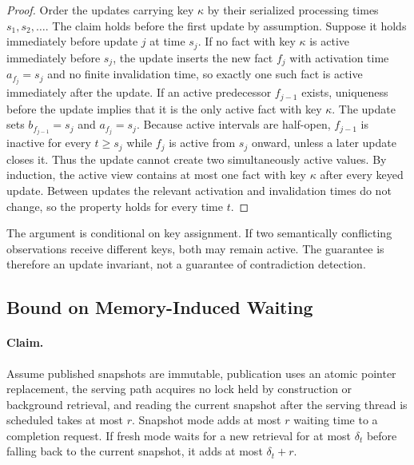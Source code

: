 \documentclass[letterpaper]{article} %
\begin{document}
\begin{proof}
Order the updates carrying key $\kappa$ by their serialized processing times $s_1,s_2,\ldots$. The claim holds before the first update by assumption. Suppose it holds immediately before update $j$ at time $s_j$. If no fact with key $\kappa$ is active immediately before $s_j$, the update inserts the new fact $f_j$ with activation time $a_{f_j}=s_j$ and no finite invalidation time, so exactly one such fact is active immediately after the update. If an active predecessor $f_{j-1}$ exists, uniqueness before the update implies that it is the only active fact with key $\kappa$. The update sets $b_{f_{j-1}}=s_j$ and $a_{f_j}=s_j$. Because active intervals are half-open, $f_{j-1}$ is inactive for every $t\ge s_j$ while $f_j$ is active from $s_j$ onward, unless a later update closes it. Thus the update cannot create two simultaneously active values. By induction, the active view contains at most one fact with key $\kappa$ after every keyed update. Between updates the relevant activation and invalidation times do not change, so the property holds for every time $t$.
\end{proof}

The argument is conditional on key assignment. If two semantically conflicting observations receive different keys, both may remain active. The guarantee is therefore an update invariant, not a guarantee of contradiction detection.

\subsection{Bound on Memory-Induced Waiting}

\paragraph{Claim.} Assume published snapshots are immutable, publication uses an atomic pointer replacement, the serving path acquires no lock held by construction or background retrieval, and reading the current snapshot after the serving thread is scheduled takes at most $r$. Snapshot mode adds at most $r$ waiting time to a completion request. If fresh mode waits for a new retrieval for at most $\delta_t$ before falling back to the current snapshot, it adds at most $\delta_t+r$.
\end{document}
